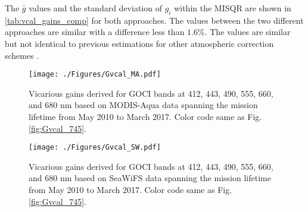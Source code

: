 \documentclass[10pt]{article}
\begin{document}
The $\bar{g}$ values and the standard deviation of $g_i$ within the MISQR are shown in \autoref{tab:vcal_gains_comp} for both approaches. 
The values between the two different approaches are similar with a difference less than $1.6\%$.
The values are similar but not identical to previous estimations for other atmospheric correction schemes \cite{Wang:13,Ahn2015}.
\begin{figure}[H]
  \centering
  \texttt{[image: ./Figures/Gvcal\_MA.pdf]}
    \caption{Vicarious gains derived for GOCI bands at 412, 443, 490, 555, 660, and 680 nm based on MODIS-Aqua data spanning the mission lifetime from May 2010 to March 2017. Color code same as Fig. \ref{fig:Gvcal_745}.  \label{fig:Gvcal_MA}} 
\end{figure}
\begin{figure}[H]
  \centering
  \texttt{[image: ./Figures/Gvcal\_SW.pdf]}
    \caption{Vicarious gains derived for GOCI bands at 412, 443, 490, 555, 660, and 680 nm based on SeaWiFS data spanning the mission lifetime from May 2010 to March 2017. Color code same as Fig. \ref{fig:Gvcal_745}.  \label{fig:Gvcal_SW}} 
\end{figure}





\end{document}
